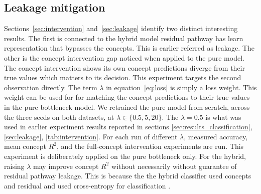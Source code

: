 \documentclass[journal,twoside,web]{ieeecolor}
\begin{document}
\subsection{Leakage mitigation}
\label{sec:mitigation}

Sections~\ref{sec:intervention} and~\ref{sec:leakage} identify two distinct interesting results. The first is connected to the hybrid model residual pathway has learn representation that bypasses the concepts. This is earlier referred as leakage. The other is the concept intervention gap noticed when applied to the pure model. The concept intervention shows its own concept predictions diverge from their true values which matters to its decision. This experiment targets the second observation directly. The term $\lambda$ in equation~\ref{eq:loss} is simply a loss weight. This weight can be used for for matching the concept predictions to their true values in the pure bottleneck model. We retrained the pure model from scratch, across the three seeds on both datasets, at $\lambda \in \{0.5, 5, 20\}$.  The $\lambda=0.5$ is what was used in earlier experiment results reported in sections \ref{sec:results_classification}, \ref{sec:leakage}, \ref{tab:intervention}. For each run of different $\lambda$, measured accuracy, mean concept $R^2$, and the full-concept intervention experiments are run. This experiment is deliberately applied on the  pure bottleneck only. For the hybrid, raising $\lambda$ may improve concept $R^2$ without necessarily without guarantee of residual pathway leakage. This is because the the hybrid classifier used concepts and residual and used cross-entropy for classification . 
\end{document}
